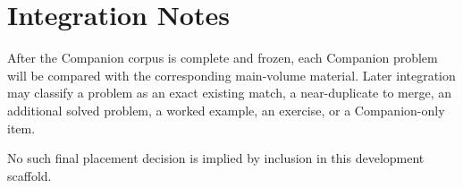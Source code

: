 \chapter*{Integration Notes}

After the Companion corpus is complete and frozen, each Companion problem will be
compared with the corresponding main-volume material. Later integration may classify a
problem as an exact existing match, a near-duplicate to merge, an additional solved
problem, a worked example, an exercise, or a Companion-only item.

No such final placement decision is implied by inclusion in this development scaffold.
